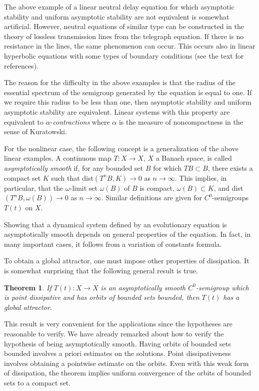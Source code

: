 \documentclass{surv-l}
\theoremstyle{plain}
\newtheorem*{theo}{Theorem}
\theoremstyle{definition}
\numberwithin{equation}{section}
\numberwithin{figure}{chapter}
\begin{document}
The above example of a linear neutral delay equation for which asymptotic stability and uniform asymptotic stability are not equivalent is somewhat artificial. However, neutral equations of similar type can be constructed in the theory of lossless transmission lines from the telegraph equation. If there is no resistance in the lines, the same phenomenon can occur. This occurs also in linear hyperbolic equations with some types of boundary conditions (see the text for references).

The reason for the difficulty in the above examples is that the radius of the essential spectrum of the semigroup generated by the equation is equal to one. If we require this radius to be less than one, then asymptotic stability and uniform asymptotic stability are equivalent. Linear systems with this property are equivalent to $\alpha$-\emph{contractions} where $\alpha$ is the measure of noncompactness in the sense of Kuratowski.

For the nonlinear case, the following concept is a generalization of the above linear examples. A continuous map $T\!:X\rightarrow X,\,X$ a Banach space, is called \emph{asymptotically smooth} if, for any bounded set $B$ for which $TB\subset B$, there exists a compact set $K$ such that dist$(T^{n}B,K)\rightarrow 0$ as $ n\rightarrow\infty$. This
implies, in particular, that the $\omega$-limit set $\omega(B)$ of $B$ is compact, $\omega(B)\subset K$, and dist$(T^{n}B, \omega(B))\rightarrow 0$ as $ n\rightarrow\infty$. Similar definitions are given for $C^{0}$-semigroups $T(t)$ on $X$.

Showing that a dynamical system defined by an evolutionary equation is asymptotically smooth depends on general properties of the equation. In fact, in many important cases, it follows from a variation of constants formula.

To obtain a global attractor, one must impose other properties of dissipation. It is somewhat surprising that the following general result is true.

\begin{theo}
If $T(t)\!:X\rightarrow X$ is an asymptotically smooth $C^{0}$-semigroup which is point dissipative and has orbits of bounded sets bounded, then $T(t)$ has a global attractor.
\end{theo}

This result is very convenient for the applications since the hypotheses are reasonable to verify. We have already remarked about how to verify the hypothesis of being asymptotically smooth. Having orbits of bounded sets bounded involves a priori estimates on the solutions. Point dissipativeness involves obtaining a pointwise estimate on the orbits. Even with this weak form of dissipation, the theorem implies uniform convergence of the orbits of bounded sets to a compact set.
\end{document}
